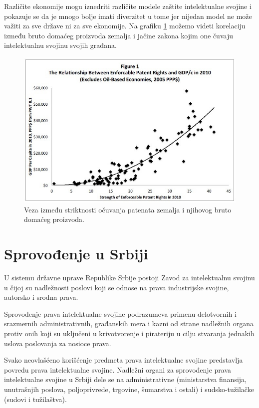 \documentclass[a4paper]{article}
\begin{document}
Različite ekonomije mogu iznedriti različite modele zaštite intelektualne
svojine i pokazuje se da je mnogo bolje imati diverzitet u tome jer nijedan
model ne može važiti za sve države ni za sve ekonomije. Na grafiku \ref{fig:pat_gdp} možemo videti korelaciju između bruto domaćeg proizvoda zemalja i jačine zakona kojim one čuvaju intelektualnu svojinu svojih građana.

\begin{figure}
\begin{center}
\includegraphics[scale=0.4615]{patents_and_gdp.jpg}
\end{center}
\caption{Veza između striktnosti očuvanja patenata zemalja i njihovog bruto domaćeg proizvoda.}
\label{fig:pat_gdp}
\end{figure}

\newpage

\section{Sprovođenje u Srbiji}

U sistemu državne uprave Republike Srbije postoji Zavod za intelektualnu svojinu u čijoj su nadležnosti poslovi koji se odnose na prava industrijske svojine, autorsko i srodna prava.

Sprovođenje prava intelektualne svojine podrazumeva primenu delotvornih i srazmernih administrativnih, građanskih mera i kazni od strane nadležnih organa protiv onih koji su uključeni u krivotvorenje i pirateriju u cilju stvaranja jednakih uslova poslovanja za nosioce prava.

Svako neovlašćeno korišćenje predmeta prava intelektualne svojine predstavlja povredu prava intelektualne svojine. Nadležni organi za sprovođenje prava intelektualne svojine u Srbiji dele se na administrativne (ministarstva finansija, unutrašnjih poslova, poljoprivrede, trgovine, šumarstva i ostali) i sudsko-tužilačke (sudovi i tužilaštva).
\end{document}
